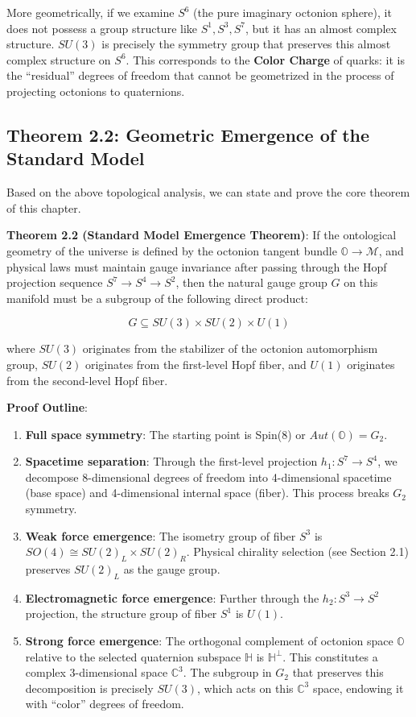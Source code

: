 \begin{enumerate}
More geometrically, if we examine $S^6$ (the pure imaginary octonion sphere), it does not possess a group structure like $S^1, S^3, S^7$, but it has an almost complex structure. $SU(3)$ is precisely the symmetry group that preserves this almost complex structure on $S^6$. This corresponds to the \textbf{Color Charge} of quarks: it is the ``residual'' degrees of freedom that cannot be geometrized in the process of projecting octonions to quaternions.
\end{enumerate}

\subsection{Theorem 2.2: Geometric Emergence of the Standard Model}

Based on the above topological analysis, we can state and prove the core theorem of this chapter.

\textbf{Theorem 2.2 (Standard Model Emergence Theorem)}:
If the ontological geometry of the universe is defined by the octonion tangent bundle $\mathbb{O} \to \mathcal{M}$, and physical laws must maintain gauge invariance after passing through the Hopf projection sequence $S^7 \to S^4 \to S^2$, then the natural gauge group $G$ on this manifold must be a subgroup of the following direct product:

\[G \subseteq SU(3) \times SU(2) \times U(1)\]

where $SU(3)$ originates from the stabilizer of the octonion automorphism group, $SU(2)$ originates from the first-level Hopf fiber, and $U(1)$ originates from the second-level Hopf fiber.

\textbf{Proof Outline}:

\begin{enumerate}
\item \textbf{Full space symmetry}: The starting point is Spin(8) or $Aut(\mathbb{O}) = G_2$.
\item \textbf{Spacetime separation}: Through the first-level projection $h_1: S^7 \to S^4$, we decompose 8-dimensional degrees of freedom into 4-dimensional spacetime (base space) and 4-dimensional internal space (fiber). This process breaks $G_2$ symmetry.
\item \textbf{Weak force emergence}: The isometry group of fiber $S^3$ is $SO(4) \cong SU(2)_L \times SU(2)_R$. Physical chirality selection (see Section 2.1) preserves $SU(2)_L$ as the gauge group.
\item \textbf{Electromagnetic force emergence}: Further through the $h_2: S^3 \to S^2$ projection, the structure group of fiber $S^1$ is $U(1)$.
\item \textbf{Strong force emergence}: The orthogonal complement of octonion space $\mathbb{O}$ relative to the selected quaternion subspace $\mathbb{H}$ is $\mathbb{H}^\perp$. This constitutes a complex 3-dimensional space $\mathbb{C}^3$. The subgroup in $G_2$ that preserves this decomposition is precisely $SU(3)$, which acts on this $\mathbb{C}^3$ space, endowing it with ``color'' degrees of freedom.
\end{enumerate}

